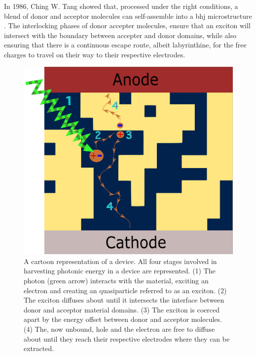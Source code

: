 In 1986, Ching W. Tang
showed that, processed under the right conditions, a blend of donor and acceptor molecules can self-assemble
into a \gls{bhj} microstructure \cite{Tang1986}. 
The interlocking phases of donor accepter molecules, ensure
that an exciton will intersect with the boundary between accepter and donor domains, while also ensuring that
there
is a continuous escape route, albeit labyrinthine, for the free charges to travel on their way to their respective
electrodes. 

\begin{figure}
    \center
    \includegraphics[width = .6\textwidth]{figures/BHJ-figure.png}
    \caption{A cartoon representation of a  device. All four stages involved in harvesting
    photonic energy in a  device are represented. (1) The photon (green arrow) interacts with the material,
    exciting an electron and creating an quasiparticle referred to as an exciton. (2) The exciton diffuses
    about until it intersects the interface between donor and acceptor material domains. (3) The exciton is
    coerced apart by the energy offset between donor and acceptor molecules. 
    (4) The, now unbound,  hole and the electron are free to diffuse about until they reach their respective
    electrodes where they can be extracted.}
    \label{bhj}
\end{figure}


